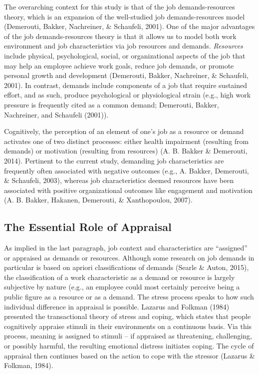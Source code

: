 \documentclass[
  english,
  man]{apa6}
\begin{document}
The overarching context for this study is that of the job demands-resources theory, which is an expansion of the well-studied job demands-resources model (Demerouti, Bakker, Nachreiner, \& Schaufeli, 2001). One of the major advantages of the job demands-resources theory is that it allows us to model both work environment and job characteristics via job resources and demands. \emph{Resources} include physical, psychological, social, or organizational aspects of the job that may help an employee achieve work goals, reduce job demands, or promote personal growth and development (Demerouti, Bakker, Nachreiner, \& Schaufeli, 2001). In contrast, demands include components of a job that require sustained effort, and as such, produce psychological or physiological strain (e.g., high work pressure is frequently cited as a common demand; Demerouti, Bakker, Nachreiner, and Schaufeli (2001)).

Cognitively, the perception of an element of one's job as a resource or demand activates one of two distinct processes: either health impairment (resulting from demands) or motivation (resulting from resources) (A. B. Bakker \& Demerouti, 2014). Pertinent to the current study, demanding job characteristics are frequently often associated with negative outcomes (e.g., A. Bakker, Demerouti, \& Schaufeli, 2003), whereas job characteristics deemed resources have been associated with positive organizational outcomes like engagement and motivation (A. B. Bakker, Hakanen, Demerouti, \& Xanthopoulou, 2007).

\hypertarget{the-essential-role-of-appraisal}{%
\subsection{The Essential Role of Appraisal}\label{the-essential-role-of-appraisal}}

As implied in the last paragraph, job context and characteristics are ``assigned'' or appraised as demands or resources. Although some research on job demands in particular is based on apriori classifications of demands (Searle \& Auton, 2015), the classification of a work characteristic as a demand or resource is largely subjective by nature (e.g., an employee could most certainly perceive being a public figure as a resource or as a demand. The stress process speaks to how such individual difference in appraisal is possible. Lazarus and Folkman (1984) presented the transactional theory of stress and coping, which states that people cognitively appraise stimuli in their environments on a continuous basis. Via this process, meaning is assigned to stimuli -- if appraised as threatening, challenging, or possibly harmful, the resulting emotional distress initiates coping. The cycle of appraisal then continues based on the action to cope with the stressor (Lazarus \& Folkman, 1984).
\end{document}
